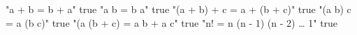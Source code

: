 "a + b = b + a" true
"a \times b = b \times a" true
"(a + b) + c = a + (b + c)" true
"(a \times b) \times c = a \times (b \times c)" true
"(a \times (b + c) = a \times b + a \times c" true
"n! = n (n - 1) (n - 2) … 1" true
